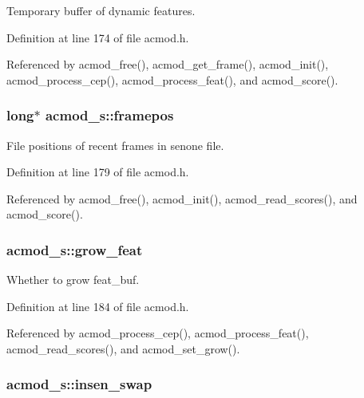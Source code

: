 \-Temporary buffer of dynamic features. 



\-Definition at line 174 of file acmod.\-h.



\-Referenced by acmod\-\_\-free(), acmod\-\_\-get\-\_\-frame(), acmod\-\_\-init(), acmod\-\_\-process\-\_\-cep(), acmod\-\_\-process\-\_\-feat(), and acmod\-\_\-score().

\subsubsection[{framepos}]{\setlength{\rightskip}{0pt plus 5cm}long$\ast$ {\bf acmod\-\_\-s\-::framepos}}\label{structacmod__s_abfd364dafee513f523e1566bb706e48b}


\-File positions of recent frames in senone file. 



\-Definition at line 179 of file acmod.\-h.



\-Referenced by acmod\-\_\-free(), acmod\-\_\-init(), acmod\-\_\-read\-\_\-scores(), and acmod\-\_\-score().

\subsubsection[{grow\-\_\-feat}]{ {\bf acmod\-\_\-s\-::grow\-\_\-feat}}\label{structacmod__s_acbb3fed9495e7b80da79cb03ff3079a1}


\-Whether to grow feat\-\_\-buf. 



\-Definition at line 184 of file acmod.\-h.



\-Referenced by acmod\-\_\-process\-\_\-cep(), acmod\-\_\-process\-\_\-feat(), acmod\-\_\-read\-\_\-scores(), and acmod\-\_\-set\-\_\-grow().

\subsubsection[{insen\-\_\-swap}]{ {\bf acmod\-\_\-s\-::insen\-\_\-swap}}\label{structacmod__s_ae6ed7e1e5b4bec021a0ba17c0ac02bd7}



